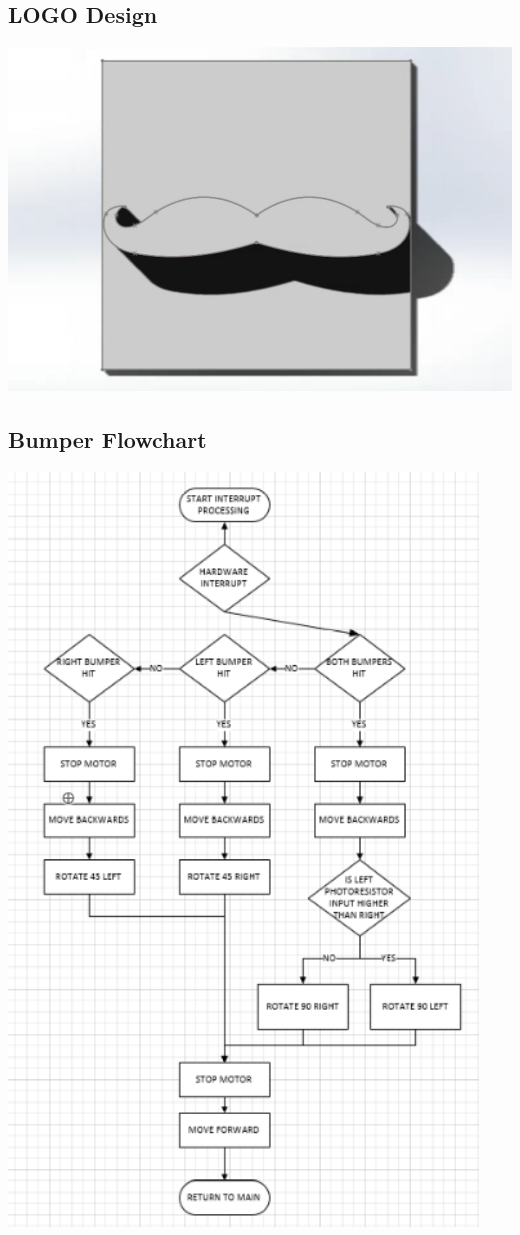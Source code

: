 \documentclass{article}
\begin{document}
\subsection{LOGO Design}
\includegraphics[width=\textwidth]{LOGO.png}
\subsection{Bumper Flowchart}
\begin{center}
\includegraphics[height=20cm]{BumperFlowchart.png}
\end{center}
\end{document}
